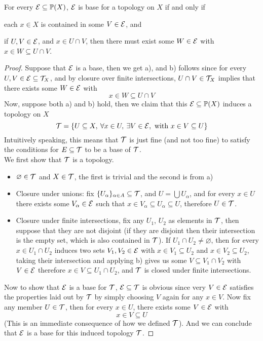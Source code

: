 \documentclass[../../main.tex]{subfiles}
\begin{document}
\begin{wts}
    For every $\mathcal{E}\subseteq\mathbb{P}(X)$, $\mathcal{E}$ is base for a topology on $X$ if and only if
    \begin{enumalpha}
        \item each $x\in X$ is contained in some $V\in\mathcal{E}$, and
        \item if $U, V\in\mathcal{E}$, and $x\in U\cap V$, then there must exist some $W\in \mathcal{E}$ with $x\in W\subseteq U\cap V$.
    \end{enumalpha}
\end{wts}
\begin{proof}
    Suppose that $\mathcal{E}$ is a base, then we get a), and b) follows since for every $U, V\in \mathcal{E}\subseteq \mathcal{T}_X$, and by closure over finite intersections, $U\cap V\in\mathcal{T}_X$ implies that there exists some $W\in\mathcal{E}$  with
    \[
    x\in W\subseteq U\cap V
    \]
    Now, suppose both a) and b) hold, then we claim that this $\mathcal{E}\subseteq\mathbb{P}(X)$ induces a topology on $X$
    \[
    \mathcal{T} = \left\{U\subseteq X,\:\forall x\in U,\:\exists V\in \mathcal{E}, \text{ with } x\in V\subseteq U\right\}
    \]
    Intuitively speaking, this means that $\mathcal{T}$ is just fine (and not too fine) to satisfy the conditions for $E\subseteq \mathcal{T}$ to be a base of $\mathcal{T}$.\\
    
    We first show that $\mathcal{T}$ is a topology.
    \begin{itemize}
        \item $\varnothing\in\mathcal{T}$ and $X\in \mathcal{T}$, the first is trivial and the second is from a)
        \item Closure under unions: fix $\{U_\alpha\}_{\alpha\in A}\subseteq \mathcal{T}$, and $U = \bigcup U_\alpha$, and for every $x\in U$ there exists some $V_\alpha\in\mathcal{E}$ such that $x\in V_\alpha\subseteq U_\alpha\subseteq U$, therefore $U\in \mathcal{T}$.
        \item Closure under finite intersections, fix any $U_1$, $U_2$ as elements in $\mathcal{T}$, then suppose that they are not disjoint (if they are disjoint then their intersection is the empty set, which is also contained in $\mathcal{T}$). If $U_1\cap U_2\neq\varnothing$, then for every $x\in U_1\cap U_2$ induces two sets $V_1, V_2\in\mathcal{E}$ with $x\in V_1\subseteq U_2$ and $x\in V_2\subseteq U_2$, taking their intersection and applying b) gives us some $V\subseteq V_1\cap V_2$ with $V\in\mathcal{E}$ therefore $x\in V\subseteq U_1\cap U_2$, and $\mathcal{T}$ is closed under finite intersections.
    \end{itemize}
    Now to show that $\mathcal{E}$ is a base for $\mathcal{T}$, $\mathcal{E}\subseteq\mathcal{T}$ is obvious since very $V\in\mathcal{E}$ satisfies the properties laid out by $\mathcal{T}$ by simply choosing $V$ again for any $x\in V$. Now fix any member $U\in \mathcal{T}$, then for every $x\in U$, there exists some $V\in \mathcal{E}$ with
    \[
    x\in V\subseteq U
    \]
    (This is an immediate consequence of how we defined $\mathcal{T}$). And we can conclude that $\mathcal{E}$ is a base for this induced topology $\mathcal{T}$.
\end{proof}
\end{document}
